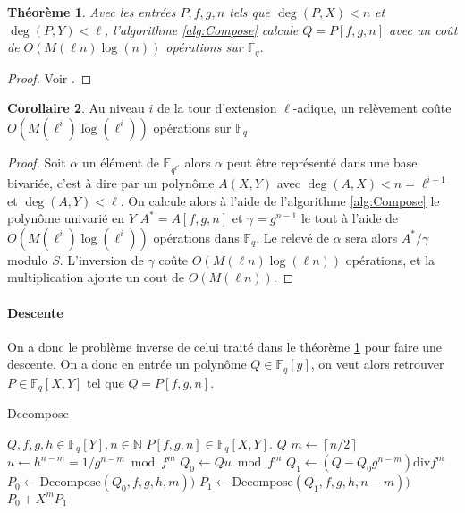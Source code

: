 \documentclass[10pt,a4paper]{book}
\theoremstyle{plain}
\newtheorem{thm}{Théorème}
\theoremstyle{definition}
\theoremstyle{definition}
\newtheorem{cor}[thm]{Corollaire}
\theoremstyle{definition}
\theoremstyle{definition}
\theoremstyle{remark}
\theoremstyle{remark}
\begin{document}
\begin{thm}\label{thm:compose}
Avec les entrées $P,f,g,n$ tels que $\deg(P,X)<n$ et $\deg(P,Y)<\ell$, l'algorithme \ref{alg:Compose} calcule $Q=P[f,g,n]$ avec un coût de $O(M(\ell n)\log(n))$ opérations sur $\mathbb{F}_q$.
\end{thm}

\begin{proof}
Voir \cite{DeFeo-Doliskani-Schost13}.
\end{proof}

\begin{cor}
Au niveau $i$ de la tour d'extension $\ell$-adique, un relèvement coûte $O(M(\ell^i)\log(\ell^i))$ opérations sur $\mathbb{F}_q$
\end{cor}

\begin{proof}
Soit $\alpha$ un élément de $\mathbb{F}_{q^{\ell^i}}$ alors $\alpha$ peut être représenté dans une base bivariée, c'est à dire par un polynôme $A(X,Y)$ avec $\deg(A,X)<n=\ell^{i-1}$ et $\deg(A,Y)<\ell$. On calcule alors à l'aide de l'algorithme \ref{alg:Compose} le polynôme univarié en $Y$ $A^*=A[f,g,n]$ et $\gamma = g^{n-1}$ le tout à l'aide de $O(M(\ell^i)\log(\ell^i))$ opérations dans $\mathbb{F}_q$. Le relevé de $\alpha$ sera alors $A^*/\gamma$ modulo $S$. L'inversion de $\gamma$ coûte $O(M(\ell n)\log(\ell n))$ opérations, et la multiplication ajoute un cout de $O(M(\ell n))$.
\end{proof}

\paragraph{Descente}
On a donc le problème inverse de celui traité dans le théorème \ref{thm:compose} pour faire une descente. On a donc en entrée un polynôme $Q \in \mathbb{F}_q[y]$, on veut alors retrouver $P\in \mathbb{F}_q[X,Y]$ tel que $Q=P[f,g,n]$. 
\begin{algorithm}
\caption{\label{alg:Decompose}Decompose}
\begin{algorithmic}[1]
\REQUIRE $Q,f,g,h \in \mathbb{F}_q[Y], n \in \mathbb{N}$
\ENSURE $P[f,g,n] \in \mathbb{F}_q[X,Y]$.
 \RETURN $Q$
\ELSE
\STATE $m \gets \left\lceil n/2 \right\rceil   $
\STATE $u \gets h^{n-m}=1/g^{n-m} \bmod f^m$
\STATE $Q_0 \gets Qu \bmod f^m$
\STATE $Q_1 \gets (Q-Q_0g^{n-m}) \mathrm{div} f^m$
\STATE $P_0 \gets \textrm{Decompose}(Q_0,f,g,h,m))$
\STATE $P_1 \gets \textrm{Decompose}(Q_1,f,g,h,n-m))$
\RETURN $P_0 + X^mP_1$ 
\ENDIF
\end{algorithmic}
\end{algorithm}
\end{document}
